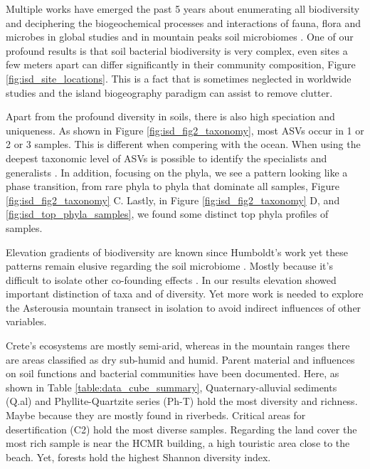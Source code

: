 Multiple works have emerged the past 5 years about enumerating all
biodiversity \parencite{Anthony2023} and deciphering the biogeochemical 
processes and interactions of fauna, flora and microbes in global
studies \parencite{Fry2019, Crowther2019,GRANDY201640,Delgado-Baquerizo2020} and
in mountain peaks soil microbiomes \parencite{Adamczyk2019}. One of our profound
results is that soil bacterial biodiversity is very complex, even sites a few meters apart can differ
significantly in their community composition, Figure \ref{fig:isd_site_locations}.
This is a fact that is sometimes neglected in worldwide studies and the island biogeography
paradigm can assist to remove clutter.

Apart from the profound diversity in soils, there is also high speciation and uniqueness. 
As shown in Figure \ref{fig:isd_fig2_taxonomy}, most ASVs occur in 1 or 2 or 3 samples.
This is different when compering with the ocean. When using the deepest taxonomic
level of ASVs is possible to identify the specialists and generalists \parencite{Barberan2012}. 
In addition, focusing on the phyla, we see a pattern looking like a phase transition, from 
rare phyla to phyla that dominate all samples, Figure \ref{fig:isd_fig2_taxonomy} C. Lastly, in Figure \ref{fig:isd_fig2_taxonomy} D,
and \ref{fig:isd_top_phyla_samples}, we found some distinct top phyla profiles of samples.

Elevation gradients of biodiversity are known since Humboldt's work \parencite{Rahbek2019} 
yet these patterns remain elusive regarding the soil microbiome \parencite{Looby2020, Siles2023}.
Mostly because it's difficult to isolate other co-founding effects \parencite{Nottingham2018}.
In our results elevation showed important distinction of taxa and of diversity. Yet more work is 
needed to explore the Asterousia mountain transect in isolation to avoid indirect influences of 
other variables.

Crete's ecosystems are mostly semi-arid, whereas in the mountain ranges there 
are areas classified as dry sub-humid and humid. Parent material and influences
on soil functions and bacterial communities have been documented. Here, as shown in Table \ref{table:data_cube_summary},
Quaternary-alluvial sediments (Q.al) and Phyllite-Quartzite series (Ph-T) hold the most diversity 
and richness. Maybe because they are mostly found in riverbeds. Critical areas for 
desertification (C2) hold the most diverse samples. Regarding the land cover the most
rich sample is near the HCMR building, a high touristic area close to the beach. Yet, forests
hold the highest Shannon diversity index.

